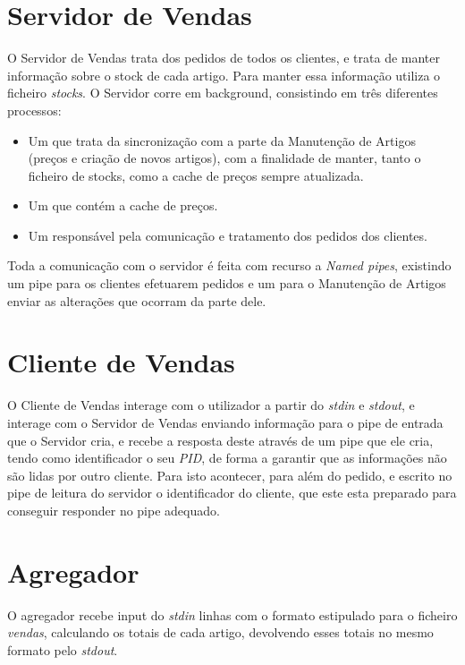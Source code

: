 \documentclass[a4paper]{report}
\begin{document}
\section{Servidor de Vendas}

O Servidor de Vendas trata dos pedidos de todos os clientes, e trata de 
manter informação sobre o stock de cada artigo. Para manter essa informação
utiliza o ficheiro \textit{stocks}. O Servidor corre em background, consistindo
em três diferentes processos:
\begin{itemize} 
    \item Um que trata da sincronização com a
        parte da Manutenção de Artigos (preços e criação de novos artigos), com a
        finalidade de manter, tanto o ficheiro de stocks, como a cache de preços
        sempre atualizada.
    \item Um que contém a cache de preços.
    \item Um responsável pela comunicação e tratamento dos pedidos dos clientes.
\end{itemize}
Toda a comunicação com o servidor é feita com recurso a \textit{Named pipes},
existindo um pipe para os clientes efetuarem pedidos e um para o Manutenção
de Artigos enviar as alterações que ocorram da parte dele.

\section{Cliente de Vendas}

O Cliente de Vendas interage com o utilizador a partir do \textit{stdin} e 
\textit{stdout}, e interage com o Servidor de Vendas enviando informação
para o pipe de entrada que o Servidor cria, e recebe a resposta deste
através de um pipe que ele cria, tendo como identificador o seu \textit{PID},
de forma a garantir que as informações não são lidas por outro cliente.
Para isto acontecer, para além do pedido, e escrito no pipe de leitura do
servidor o identificador do cliente, que este esta preparado para conseguir
responder no pipe adequado.

\section{Agregador}

O agregador recebe input do \textit{stdin} linhas com o formato estipulado
para o ficheiro \textit{vendas}, calculando os totais de cada artigo,
devolvendo esses totais no mesmo formato pelo \textit{stdout}.
\end{document}

